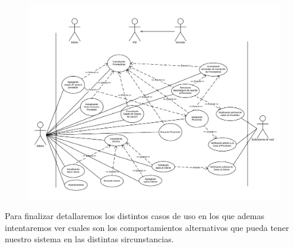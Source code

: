 \begin{figure}[H]
\includegraphics[width=\linewidth]{diag/viejos/cu6.pdf}
\end{figure}

Para finalizar detallaremos los distintos casos de uso en los que ademas intentaremos ver cuales son los comportamientos alternativos que pueda tener nuestro sistema en las distintas sircunstancias.

